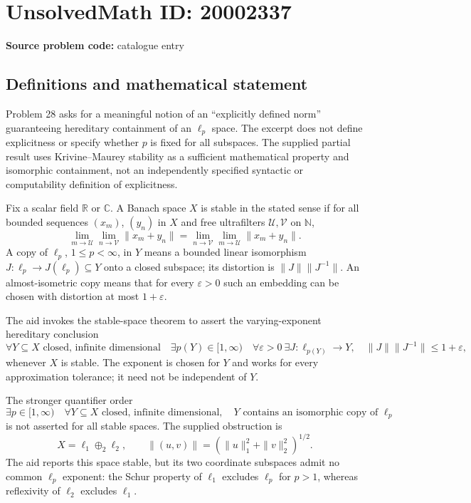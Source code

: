 \documentclass[11pt]{article}
\newcommand{\N}{\mathbb{N}}
\newcommand{\R}{\mathbb{R}}
\newcommand{\C}{\mathbb{C}}
\begin{document}
\section*{UnsolvedMath ID: 20002337}
\textbf{Source problem code:} catalogue entry
\subsection{Definitions and mathematical statement}
Problem 28 asks for a meaningful notion of an ``explicitly defined norm'' guaranteeing hereditary containment of an \(\ell_p\) space. The excerpt does not define explicitness or specify whether \(p\) is fixed for all subspaces. The supplied partial result uses Krivine--Maurey stability as a sufficient mathematical property and isomorphic containment, not an independently specified syntactic or computability definition of explicitness.

Fix a scalar field \(\R\) or \(\C\). A Banach space \(X\) is stable in the stated sense if for all bounded sequences \((x_m)\), \((y_n)\) in \(X\) and free ultrafilters \(\mathcal U,\mathcal V\) on \(\N\),
\[
 \lim_{m\to\mathcal U}\lim_{n\to\mathcal V}\|x_m+y_n\|
 =\lim_{n\to\mathcal V}\lim_{m\to\mathcal U}\|x_m+y_n\|.
\]
A copy of \(\ell_p\), \(1\le p<\infty\), in \(Y\) means a bounded linear isomorphism \(J:\ell_p\to J(\ell_p)\subseteq Y\) onto a closed subspace; its distortion is \(\|J\|\|J^{-1}\|\). An almost-isometric copy means that for every \(\varepsilon>0\) such an embedding can be chosen with distortion at most \(1+\varepsilon\).

The aid invokes the stable-space theorem to assert the varying-exponent hereditary conclusion
\[
 \forall Y\subseteq X\text{ closed, infinite dimensional}\quad
 \exists p(Y)\in[1,\infty)\quad
 \forall\varepsilon>0\ \exists J:\ell_{p(Y)}\to Y,
 \quad\|J\|\|J^{-1}\|\le1+\varepsilon,
\]
whenever \(X\) is stable. The exponent is chosen for \(Y\) and works for every approximation tolerance; it need not be independent of \(Y\).

The stronger quantifier order
\[
 \exists p\in[1,\infty)\quad
 \forall Y\subseteq X\text{ closed, infinite dimensional},\quad
 Y\text{ contains an isomorphic copy of }\ell_p
\]
is not asserted for all stable spaces. The supplied obstruction is
\[
 X=\ell_1\oplus_2\ell_2,\qquad
 \|(u,v)\|=(\|u\|_1^2+\|v\|_2^2)^{1/2}.
\]
The aid reports this space stable, but its two coordinate subspaces admit no common \(\ell_p\) exponent: the Schur property of \(\ell_1\) excludes \(\ell_p\) for \(p>1\), whereas reflexivity of \(\ell_2\) excludes \(\ell_1\).
\end{document}
